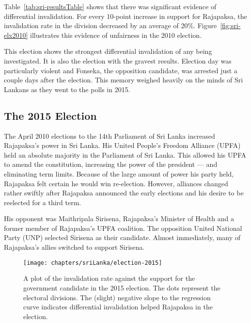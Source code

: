 Table~\ref{tab:sri-resultsTable} shows that there was significant evidence of differential invalidation. For every 10-point increase in support for Rajapaksa, the invalidation rate in the division decreased by an average of 20\%. Figure~\ref{fig:sri-elx2010} illustrates this evidence of unfairness in the 2010 election.

This election shows the strongest differential invalidation of any being investigated. It is also the election with the gravest results. Election day was particularly violent and Fonseka, the opposition candidate, was arrested just a couple days after the election. This memory weighed heavily on the minds of Sri Lankans as they went to the polls in 2015.










\subsection{The 2015 Election}
The April 2010 elections to the 14th Parliament of Sri Lanka increased Rajapaksa's power in Sri Lanka. His United People's Freedom Alliance (UPFA) held an absolute majority in the Parliament of Sri Lanka. This allowed his UPFA to amend the constitution, increasing the power of the president --- and eliminating term limits.\cite{haviland-2010} Because of the large amount of power his party held, Rajapaksa felt certain he would win re-election. However, alliances changed rather swiftly after Rajapaksa announced the early elections and his desire to be reelected for a third term.

His opponent was Maithripala Sirisena, Rajapaksa's Minister of Health and a former member of Rajapaksa's UPFA coalition. The opposition United National Party (UNP) selected Sirisena as their candidate. Almost immediately, many of Rajapaksa's allies switched to support Sirisena.\cite{tamilnet-2014}


\begin{figure}[t]
\texttt{[image: chapters/sriLanka/election-2015]}
\caption[Invalidation plot for the 2015 presidential election]{A plot of the invalidation rate against the support for the government candidate in the 2015 election. The dots represent the electoral divisions. The (slight) negative slope to the regression curve indicates differential invalidation helped Rajapaksa in the election. }
\label{fig:sri-elx2015}
\end{figure}


